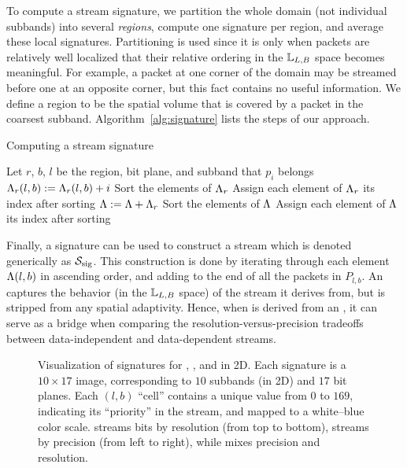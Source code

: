 To compute a stream signature, we partition the whole domain (not individual subbands) into several
\emph{regions}, compute one signature per region, and average these local signatures. Partitioning
is used since it is only when packets are relatively well localized that their relative ordering in
the ${\mathbb L}_{L,B}$ space becomes meaningful. For example, a packet at one corner of the domain may
be streamed before one at an opposite corner, but this fact contains no useful information. We
define a region to be the spatial volume that is covered by a packet in the coarsest subband.
Algorithm~\ref{alg:signature} lists the steps of our approach.

\begin{algorithm}[h]
  \caption{Computing a stream signature}
  \begin{algorithmic}[1]
			\State Let $r$, $b$, $l$ be the region, bit plane, and subband that $p_i$ belongs
			\State $\sgn_r(l,b) := \sgn_r(l,b)+i$
		\EndFor
			\State Sort the elements of $\sgn_r$
			\State Assign each element of $\sgn_r$ its index after sorting
			\State $\sgn := \sgn+\sgn_r$
		\EndFor
		\State Sort the elements of $\sgn$
		\State Assign each element of $\sgn$ its index after sorting
	\end{algorithmic}
	\label{alg:signature}
\end{algorithm}

Finally, a signature can be used to construct a stream which is denoted generically as $\ssig$. This
construction is done by iterating through each element $\sgn(l,b)$ in ascending order, and adding to
the end of \ssig all the packets in $P_{l,b}$. An \ssig captures the behavior (in the ${\mathbb L}_{L,B}$
space) of the stream it derives from, but is stripped from any spatial adaptivity. Hence, when \ssig
is derived from an \sopt, it can serve as a bridge when comparing the resolution-versus-precision
tradeoffs between data-independent and data-dependent streams.

\begin{figure}[t]
\centering
\caption{Visualization of signatures for \slvl, \sbit, and \swav in 2D. Each signature is a
$10\times 17$ image, corresponding to $10$ subbands (in 2D) and $17$ bit planes. Each $(l,b)$
``cell'' contains a unique value from $0$ to $169$, indicating its ``priority'' in the stream, and
mapped to a white--blue color scale. \slvl streams bits by resolution (from top to bottom), \sbit
streams by precision (from left to right), while \swav mixes precision and resolution.}
\label{fig:example-signatures}
\end{figure}
